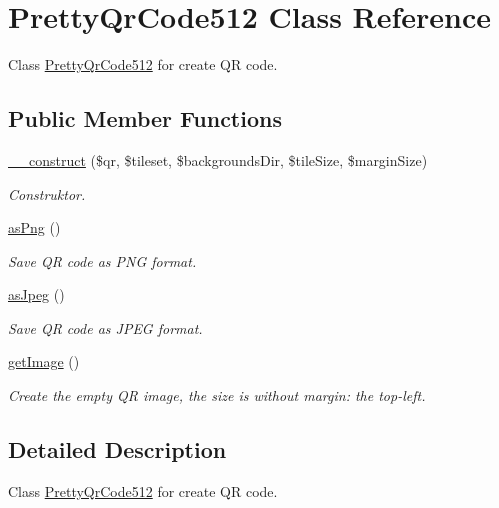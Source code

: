 \hypertarget{class_pretty_qr_code512}{\section{Pretty\-Qr\-Code512 Class Reference}
\label{class_pretty_qr_code512}
}


Class \hyperlink{class_pretty_qr_code512}{Pretty\-Qr\-Code512} for create Q\-R code.  


\subsection*{Public Member Functions}
\begin{DoxyCompactItemize}
\item 
\hyperlink{class_pretty_qr_code512_a57fe799b94b85a69a01e107ac5053d67}{\-\_\-\-\_\-construct} (\$qr, \$tileset, \$backgrounds\-Dir, \$tile\-Size, \$margin\-Size)
\begin{DoxyCompactList}\small\item\em Construktor. \end{DoxyCompactList}\item 
\hyperlink{class_pretty_qr_code512_a61479e2101fa38b87f465f5770264176}{as\-Png} ()
\begin{DoxyCompactList}\small\item\em Save Q\-R code as P\-N\-G format. \end{DoxyCompactList}\item 
\hyperlink{class_pretty_qr_code512_a79071ba86e63ae203002aa05921e5df1}{as\-Jpeg} ()
\begin{DoxyCompactList}\small\item\em Save Q\-R code as J\-P\-E\-G format. \end{DoxyCompactList}\item 
\hyperlink{class_pretty_qr_code512_a0cbf9d74b39775e0873b3ebc9a5da981}{get\-Image} ()
\begin{DoxyCompactList}\small\item\em Create the empty Q\-R image, the size is without margin\-: the top-\/left. \end{DoxyCompactList}\end{DoxyCompactItemize}


\subsection{Detailed Description}
Class \hyperlink{class_pretty_qr_code512}{Pretty\-Qr\-Code512} for create Q\-R code. 

